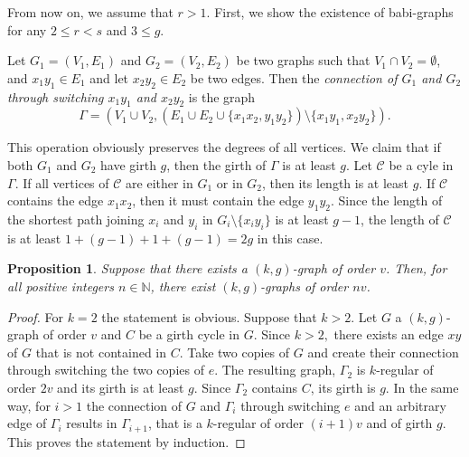 \documentclass[a4paper,11pt]{article}
\newtheorem{proposition}[theorem]{Proposition}
\begin{document}

From now on, we assume that $r>1$.
First, we show the existence of babi-graphs 
for any $2\leq r<s$ and $3\leq g$. 

Let $G_1=(V_1,E_1)$ and $G_2=(V_2,E_2)$ be two graphs such that $V_1\cap V_2=\emptyset$, and
$x_1y_1\in E_1$ and let $x_2y_2\in E_2$ be two edges. Then the \emph{connection of $G_1$ and $G_2$
through switching $x_1y_1$ and $x_2y_2$} is the graph 
$$\Gamma =
\left( V_1\cup V_2, (E_1\cup E_2\cup \{ x_1x_2,y_1y_2\} )\setminus \{ x_1y_1, x_2y_2\}  \right).$$

This operation obviously preserves the degrees of all vertices. We claim that if both $G_1$ and $G_2$ 
have girth $g$, then the girth of $\Gamma $ is at least $g$. Let $\mathcal{C}$ be a cyle in $\Gamma $. If all vertices of $\mathcal{C}$ are either in $G_1$ or in $G_2$, then its length is at least $g$. If 
$\mathcal{C}$ contains the edge $x_1x_2$, then it must contain the edge $y_1y_2$. Since the length of
the shortest path joining $x_i$ and $y_i$ in $G_i \setminus \{ x_iy_i\} $ is at least $g-1$, the length of 
$\mathcal{C}$ is at least $1+(g-1)+1+(g-1)=2g$ in this case.

\begin{proposition}
\label{sokszoroz}
Suppose that there exists a $(k,g)$-graph of order $v$. Then, for all positive integers $n\in \mathbb{N}$, 
there exist $(k,g)$-graphs of order $nv$.
\end{proposition}

\begin{proof}
For $k=2$ the statement is obvious. Suppose that $k>2.$ Let $G$ a $(k,g)$-graph of order $v$ and $C$ be 
a girth cycle in $G$. Since $k>2,$ there exists an edge $xy$ of $G$ that is not contained in $C$. Take two copies of $G$ and create their connection through switching the two copies of $e$. The resulting graph,
$\Gamma _2$ is $k$-regular of order $2v$ and its girth is at least $g.$ Since $\Gamma _2$ contains $C$,
its girth is $g$. In the same way, for $i>1$ the connection of $G$ and $\Gamma _i$ through switching $e$ and an arbitrary edge of $\Gamma _i$ results in $\Gamma _{i+1}$, that is a $k$-regular of order 
$(i+1)v$ and of girth $g$. This proves the statement by induction.
\end{proof}
\end{document}
